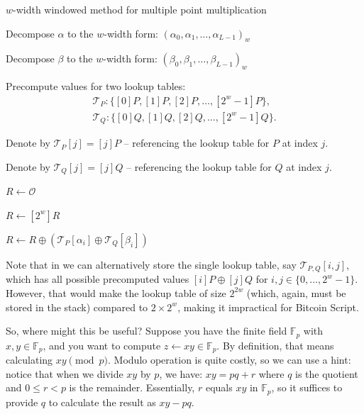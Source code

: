 \documentclass{iacrtrans}
\begin{document}
\begin{algorithm}
\caption{$w$-width windowed method for multiple point multiplication}


Decompose $\alpha$ to the $w$-width form: $(\alpha_0, \alpha_1, \ldots, \alpha_{L-1})_w$

Decompose $\beta$ to the $w$-width form: $(\beta_0, \beta_1, \ldots, \beta_{L-1})_w$

Precompute values for two lookup tables: 
\begin{gather*}
    \mathcal{T}_P: \{[0]P, [1]P, [2]P, \ldots, [2^w - 1]P\}, \\
    \mathcal{T}_Q: \{[0]Q, [1]Q, [2]Q, \ldots, [2^w - 1]Q\}.
\end{gather*}

Denote by $\mathcal{T}_P[j] = [j]P$ -- referencing the lookup table for $P$ at index $j$.

Denote by $\mathcal{T}_Q[j] = [j]Q$ -- referencing the lookup table for $Q$ at index $j$.

$R \gets \mathcal{O}$

 {
    $R \gets [2^w]R$
    
    $R \gets R \oplus (\mathcal{T}_P[\alpha_i] \oplus \mathcal{T}_Q[\beta_i])$
}

\label{alg:double_multiplication}
\end{algorithm}

\begin{remark}
    Note that in  we can alternatively store the single lookup table, say $\mathcal{T}_{P,Q}[i,j]$, which has all possible precomputed values $[i]P \oplus [j]Q$ for $i,j \in \{0,\dots,2^{w}-1\}$. However, that would make the lookup table of size $2^{2w}$ (which, again, must be stored in the stack) compared to $2 \times 2^{w}$, making it impractical for Bitcoin Script.
\end{remark}

So, where might this be useful? Suppose you have the finite field $\mathbb{F}_p$ with $x,y \in \mathbb{F}_p$, and you want to compute $z \gets xy \in \mathbb{F}_p$. By definition, that means calculating $xy \pmod{p}$. Modulo operation is quite costly, so we can use a hint: notice that when we divide $xy$ by $p$, we have: $xy = pq + r$ where $q$ is the quotient and $0 \leq r < p$ is the remainder. Essentially, $r$ equals $xy$ in $\mathbb{F}_p$, so it suffices to provide $q$ to calculate the result as $xy-pq$. 
\end{document}
